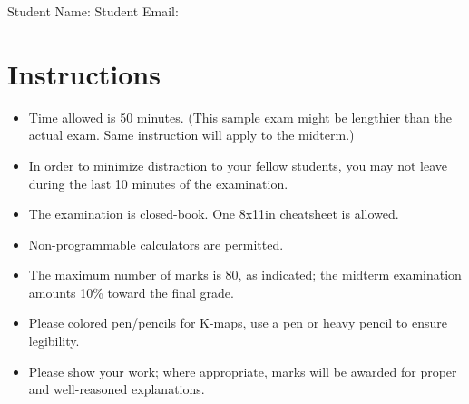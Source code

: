 
\maketitle

Student Name: \hfill Student Email: \hspace{10em}
\section{Instructions}
\begin{itemize}
  \item Time allowed is 50 minutes. (This sample exam might be lengthier than the actual exam.  Same instruction will apply to the midterm.)
  \item In order to minimize distraction to your fellow students, you may not leave
  during the last 10 minutes of the examination.
  \item The examination is closed-book. One 8x11in cheatsheet is allowed.
  \item Non-programmable calculators are permitted.
  \item The maximum number of marks is 80, as indicated; the midterm examination
  amounts 10\% toward the final grade.
  \item Please colored pen/pencils for K-maps, use a pen or heavy pencil to ensure legibility.
  \item Please show your work; where appropriate, marks will be awarded for proper and well-reasoned explanations.
\end{itemize}


